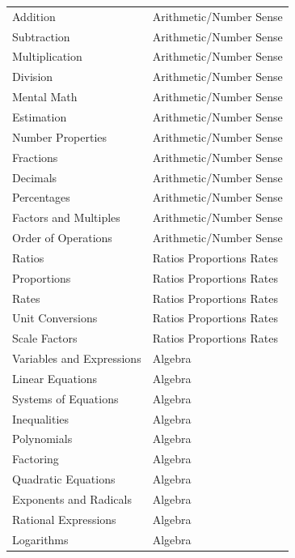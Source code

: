 \documentclass[
    a4paper, %
    10pt, %
    twoside, %
]{LTJournalArticle}
\begin{document}
\vspace{1em}

\label{tab:math-skills}
\tabletail{\hline}
\tablelasttail{\hline}

\footnotesize
\begin{supertabular}{p{0.45\columnwidth}p{0.45\columnwidth}}
Addition & Arithmetic/Number Sense \\
Subtraction & Arithmetic/Number Sense \\
Multiplication & Arithmetic/Number Sense \\
Division & Arithmetic/Number Sense \\
Mental Math & Arithmetic/Number Sense \\
Estimation & Arithmetic/Number Sense \\
Number Properties & Arithmetic/Number Sense \\
Fractions & Arithmetic/Number Sense \\
Decimals & Arithmetic/Number Sense \\
Percentages & Arithmetic/Number Sense \\
Factors and Multiples & Arithmetic/Number Sense \\
Order of Operations & Arithmetic/Number Sense \\
Ratios & Ratios Proportions Rates \\
Proportions & Ratios Proportions Rates \\
Rates & Ratios Proportions Rates \\
Unit Conversions & Ratios Proportions Rates \\
Scale Factors & Ratios Proportions Rates \\
Variables and Expressions & Algebra \\
Linear Equations & Algebra \\
Systems of Equations & Algebra \\
Inequalities & Algebra \\
Polynomials & Algebra \\
Factoring & Algebra \\
Quadratic Equations & Algebra \\
Exponents and Radicals & Algebra \\
Rational Expressions & Algebra \\
Logarithms & Algebra \\

\end{supertabular}
\end{document}
